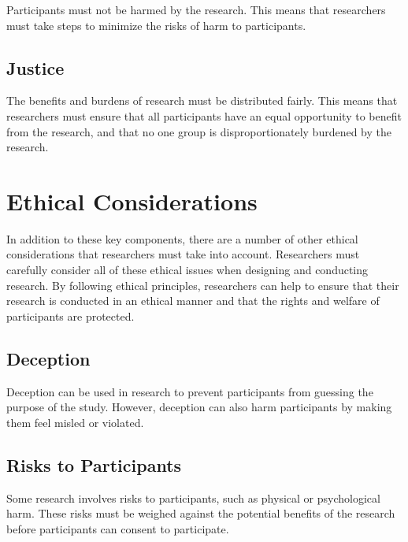 \documentclass[
  b5paper]{book}
\begin{document}
Participants must not be harmed by the research. This means that researchers must take steps to minimize the risks of harm to participants.

\hypertarget{justice}{%
\subsection*{Justice}\label{justice}}

The benefits and burdens of research must be distributed fairly. This means that researchers must ensure that all participants have an equal opportunity to benefit from the research, and that no one group is disproportionately burdened by the research.

\hypertarget{ethical-considerations}{%
\section*{Ethical Considerations}\label{ethical-considerations}}

In addition to these key components, there are a number of other ethical considerations that researchers must take into account. Researchers must carefully consider all of these ethical issues when designing and conducting research. By following ethical principles, researchers can help to ensure that their research is conducted in an ethical manner and that the rights and welfare of participants are protected.

\hypertarget{deception}{%
\subsection*{Deception}\label{deception}}

Deception can be used in research to prevent participants from guessing the purpose of the study. However, deception can also harm participants by making them feel misled or violated.

\hypertarget{risks-to-participants}{%
\subsection*{Risks to Participants}\label{risks-to-participants}}

Some research involves risks to participants, such as physical or psychological harm. These risks must be weighed against the potential benefits of the research before participants can consent to participate.
\end{document}
